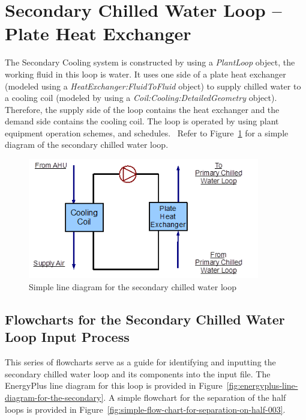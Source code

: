 \section{Secondary Chilled Water Loop -- Plate Heat Exchanger}\label{secondary-chilled-water-loop-plate-heat-exchanger}

The Secondary Cooling system is constructed by using a \emph{PlantLoop} object, the working fluid in this loop is water. It uses one side of a plate heat exchanger (modeled using a \emph{HeatExchanger:FluidToFluid} object) to supply chilled water to a cooling coil (modeled by using a \emph{Coil:Cooling:DetailedGeometry} object). Therefore, the supply side of the loop contains the heat exchanger and the demand side contains the cooling coil. The loop is operated by using plant equipment operation schemes, and schedules. ~Refer to Figure~\ref{fig:simple-line-diagram-for-the-secondary-chilled} for a simple diagram of the secondary chilled water loop.

\begin{figure}[hbtp] %
\centering
\includegraphics[width=0.9\textwidth, height=0.9\textheight, keepaspectratio=true]{media/image103.png}
\caption{Simple line diagram for the secondary chilled water loop \protect \label{fig:simple-line-diagram-for-the-secondary-chilled}}
\end{figure}

\subsection{Flowcharts for the Secondary Chilled Water Loop Input Process}\label{flowcharts-for-the-secondary-chilled-water-loop-input-process}

This series of flowcharts serve as a guide for identifying and inputting the secondary chilled water loop and its components into the input file. The EnergyPlus line diagram for this loop is provided in Figure~\ref{fig:energyplus-line-diagram-for-the-secondary}. A simple flowchart for the separation of the half loops is provided in Figure~\ref{fig:simple-flow-chart-for-separation-on-half-003}.

